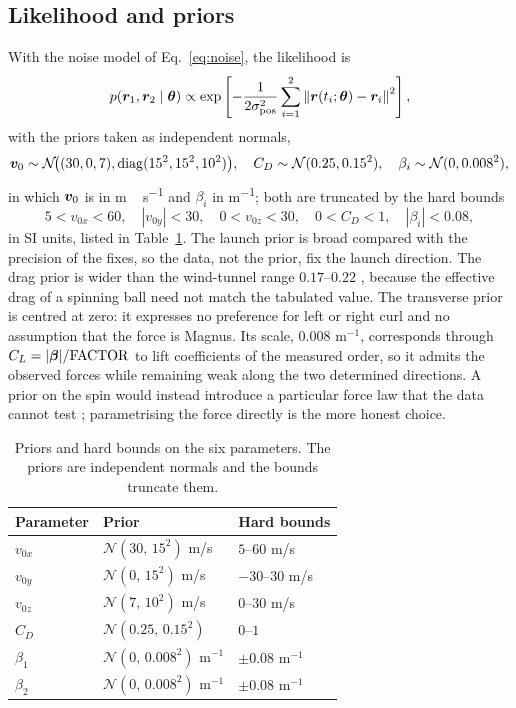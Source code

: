 \subsection{Likelihood and priors}
\label{sec:priors}

With the noise model of Eq.~\eqref{eq:noise}, the likelihood is
\begin{equation}
  p(\bm{r}_1,\bm{r}_2\mid\bm{\theta})
  \propto\exp\left[-\frac{1}{2\sigma_{\rm pos}^2}
  \sum_{i=1}^{2}\left\|\bm{r}(t_i;\bm{\theta})-\bm{r}_i\right\|^2\right],
  \label{eq:like}
\end{equation}
with the priors taken as independent normals,
\[
  \bm{v}_0\sim\mathcal N\!\big((30,0,7),\operatorname{diag}(15^2,15^2,10^2)\big),\quad
  C_D\sim\mathcal N(0.25,0.15^2),\quad
  \beta_i\sim\mathcal N(0,0.008^2),
\]
in which $\bm{v}_0$ is in \si{m\,s^{-1}} and $\beta_i$ in \si{m^{-1}}; both are
truncated by the hard bounds
\[
  5<v_{0x}<60, \quad |v_{0y}|<30, \quad 0<v_{0z}<30, \quad
  0<C_D<1, \quad |\beta_i|<0.08 ,
\]
in SI units, listed in Table~\ref{tab:priors}. The launch prior is broad compared
with the precision of the fixes, so the data, not the prior, fix the launch
direction. The drag prior is wider than the
wind-tunnel range $0.17$--$0.22$ \citep{carre2005,goff2012}, because the
effective drag of a spinning ball need not match the tabulated value. The transverse prior is centred at zero: it expresses no
preference for left or right curl and no assumption that the force is Magnus.
Its scale, $0.008$ m$^{-1}$, corresponds through
$C_L=|\bm{\beta}|/\mathrm{FACTOR}$ to lift coefficients of the measured order, so
it admits the observed forces while remaining weak along the two determined
directions. A prior on the spin would instead introduce a particular force law
that the data cannot test \citep{texier2016}; parametrising the force directly is
the more honest choice.

\begin{table}[t]
  \centering
  \caption{Priors and hard bounds on the six parameters. The priors are
  independent normals and the bounds truncate them.}
  \label{tab:priors}
  \begin{tabular}{@{}lll@{}}
    \toprule
    Parameter & Prior & Hard bounds \\
    \midrule
    $v_{0x}$ & $\mathcal N(30,\,15^2)$ m/s & $5$--$60$ m/s \\
    $v_{0y}$ & $\mathcal N(0,\,15^2)$ m/s & $-30$--$30$ m/s \\
    $v_{0z}$ & $\mathcal N(7,\,10^2)$ m/s & $0$--$30$ m/s \\
    $C_D$ & $\mathcal N(0.25,\,0.15^2)$ & $0$--$1$ \\
    $\beta_1$ & $\mathcal N(0,\,0.008^2)$ m$^{-1}$ & $\pm0.08$ m$^{-1}$ \\
    $\beta_2$ & $\mathcal N(0,\,0.008^2)$ m$^{-1}$ & $\pm0.08$ m$^{-1}$ \\
    \bottomrule
  \end{tabular}
\end{table}

